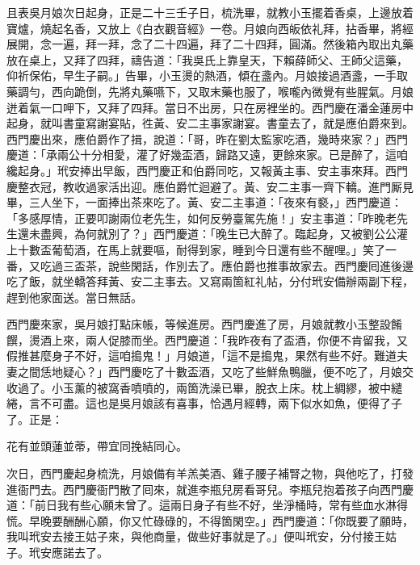 且表吳月娘次日起身，正是二十三壬子日，梳洗畢，就教小玉擺着香桌，上邊放着寶爐，燒起名香，又放上《白衣觀音經》一卷。月娘向西皈依礼拜，拈香畢，將經展開，念一遍，拜一拜，念了二十四遍，拜了二十四拜，圓滿。然後箱內取出丸藥放在桌上，又拜了四拜，禱告道：「我吳氏上靠皇天，下賴薛師父、王師父這藥，{}仰祈保佑，早生子嗣。」告畢，小玉燙的熱酒，傾在盞內。月娘接過酒盞，一手取藥調勻，西向跪倒，先將丸藥嚥下，又取末藥也服了，喉嚨內微覺有些腥氣。{}月娘迸着氣一口呷下，{}又拜了四拜。當日不出房，只在房裡坐的。西門慶在潘金蓮房中起身，就叫書童寫謝宴貼，徃黃、安二主事家謝宴。書童去了，就是應伯爵來到。西門慶出來，應伯爵作了揖，說道：「哥，昨在劉太監家吃酒，幾時來家？」西門慶道：「承兩公十分相愛，灌了好幾盃酒，歸路又遠，更餘來家。已是醉了，這咱纔起身。」玳安捧出早飯，西門慶正和伯爵同吃，又報黃主事、安主事來拜。西門慶整衣冠，教收過家活出迎。應伯爵忙迴避了。黃、安二主事一齊下轎。進門厮見畢，三人坐下，一面捧出茶來吃了。黃、安二主事道：「夜來有褻，」西門慶道：「多感厚情，正要叩謝兩位老先生，如何反勞臺駕先施！」安主事道：「昨晚老先生還未盡興，為何就別了？」西門慶道：「晚生已大醉了。臨起身，又被劉公公灌上十數盃葡萄酒，在馬上就要嘔，耐得到家，睡到今日還有些不醒哩。」笑了一番，又吃過三盃茶，說些閑話，作別去了。應伯爵也推事故家去。西門慶囘進後邊吃了飯，就坐轎答拜黃、安二主事去。又寫兩箇紅礼帖，分付玳安備辦兩副下程，趕到他家面送。當日無話。

西門慶來家，吳月娘打點床帳，等候進房。西門慶進了房，月娘就教小玉整設餚饌，燙酒上來，兩人促膝而坐。西門慶道：「我昨夜有了盃酒，你便不肯留我，又假推甚麼身子不好，這咱搗鬼！」月娘道，「這不是搗鬼，果然有些不好。難道夫妻之間恁地疑心？」西門慶吃了十數盃酒，又吃了些鮮魚鴨臘，便不吃了，月娘交收過了。小玉薰的被窩香噴噴的，兩箇洗澡已畢，脫衣上床。枕上綢繆，被中繾綣，言不可盡。這也是吳月娘該有喜事，恰遇月經轉，兩下似水如魚，便得了子了。{}正是：

花有並頭蓮並蒂，帶宜同挽結同心。

次日，西門慶起身梳洗，月娘備有羊羔美酒、雞子腰子補腎之物，與他吃了，打發進衙門去。西門慶衙門散了囘來，就進李瓶兒房看哥兒。李瓶兒抱着孩子向西門慶道：「前日我有些心願未曾了。這兩日身子有些不好，坐淨桶時，常有些血水淋得慌。早晚要酬酬心願，你又忙碌碌的，不得箇閑空。」西門慶道：「你既要了願時，我叫玳安去接王姑子來，{}與他商量，做些好事就是了。」便叫玳安，分付接王姑子。玳安應諾去了。

